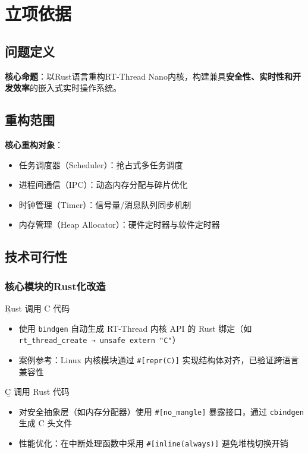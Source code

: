 \section{立项依据}

\subsection{问题定义}

\textbf{核心命题}：以Rust语言重构RT-Thread Nano内核，构建兼具\textbf{安全性、实时性和开发效率}的嵌入式实时操作系统。

\subsection{重构范围}

\textbf{核心重构对象}：

\begin{itemize}
    \item 任务调度器（Scheduler）：抢占式多任务调度
    \item 进程间通信（IPC）：动态内存分配与碎片优化
    \item 时钟管理（Timer）：信号量/消息队列同步机制
    \item 内存管理（Heap Allocator）：硬件定时器与软件定时器
\end{itemize}

\subsection{技术可行性}

\subsubsection{核心模块的Rust化改造}
\b{Rust 调用 C 代码}
\begin{itemize}
    \item 使用 \texttt{bindgen} 自动生成 RT-Thread 内核 API 的 Rust 绑定（如 \texttt{rt\_thread\_create → unsafe extern "C"}）
    \item 案例参考：Linux 内核模块通过 \texttt{\#[repr(C)]} 实现结构体对齐，已验证跨语言兼容性
\end{itemize}

\b{C 调用 Rust 代码}
\begin{itemize}
    \item 对安全抽象层（如内存分配器）使用 \texttt{\#[no\_mangle]} 暴露接口，通过 \texttt{cbindgen} 生成 C 头文件
    \item 性能优化：在中断处理函数中采用 \texttt{\#[inline(always)]} 避免堆栈切换开销
\end{itemize}

